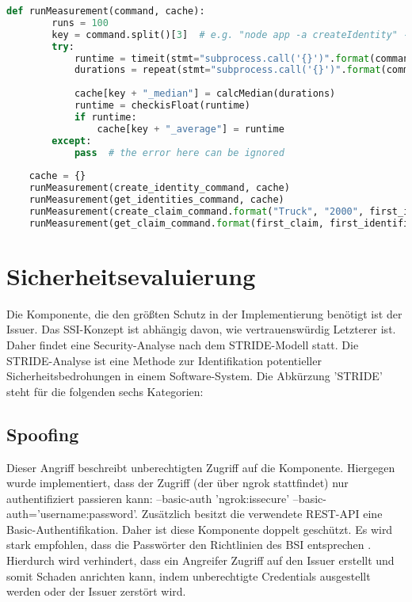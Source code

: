 \begin{lstlisting}[language=python]
	def runMeasurement(command, cache):
		runs = 100
		key = command.split()[3]  # e.g. "node app -a createIdentity" -> createIdentity
		try:
			runtime = timeit(stmt="subprocess.call('{}')".format(command), setup="import subprocess", number=runs, )
			durations = repeat(stmt="subprocess.call('{}')".format(command), setup="import subprocess", number=1, repeat=runs)
		
			cache[key + "_median"] = calcMedian(durations)
			runtime = checkisFloat(runtime)
			if runtime:
				cache[key + "_average"] = runtime
		except:
			pass  # the error here can be ignored
			
	cache = {}
	runMeasurement(create_identity_command, cache)
	runMeasurement(get_identities_command, cache)
	runMeasurement(create_claim_command.format("Truck", "2000", first_identifier), cache)
	runMeasurement(get_claim_command.format(first_claim, first_identifier), cache)	
\end{lstlisting}	

\section{Sicherheitsevaluierung}
Die Komponente, die den größten Schutz in der Implementierung benötigt ist der Issuer. Das SSI-Konzept ist abhängig davon, wie vertrauenswürdig Letzterer ist. Daher findet eine Security-Analyse nach dem STRIDE-Modell \cite{ID59} statt. Die STRIDE-Analyse ist eine Methode zur Identifikation potentieller Sicherheitsbedrohungen in einem Software-System. Die Abkürzung 'STRIDE' steht für die folgenden sechs Kategorien:

\subsection{Spoofing}
\label{Spoofing}
Dieser Angriff beschreibt unberechtigten Zugriff auf die Komponente. Hiergegen wurde implementiert, dass der Zugriff (der über ngrok stattfindet) nur authentifiziert passieren kann: --basic-auth 'ngrok:issecure' --basic-auth='username:password'. Zusätzlich besitzt die verwendete REST-API eine Basic-Authentifikation. Daher ist diese Komponente doppelt geschützt. Es wird stark empfohlen, dass die Passwörter den Richtlinien des BSI entsprechen \cite{ID60}. Hierdurch wird verhindert, dass ein Angreifer Zugriff auf den Issuer erstellt und somit Schaden anrichten kann, indem unberechtigte Credentials ausgestellt werden oder der Issuer zerstört wird.

